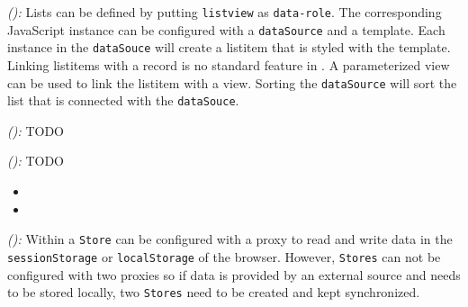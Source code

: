 \documentclass[a4paper]{artikel3}
\newcommand{\code}[1]{\texttt{#1}}
\newcommand{\setspace}[0]{\vspace{2mm}}
\renewcommand{\paragraph}[1]{\setspace \noindent {\bf #1}  }
\newcommand{\framework}[2]{ \emph{#1 (\textbf{#2}): }} %
\newcommand{\challenge}[1]{\paragraph{#1}}
\begin{document}
\framework{\kendoa{}}{}
Lists can be defined by putting \code{listview} as \code{data-role}.
The corresponding JavaScript instance can be configured with a \code{dataSource} and a template.
Each instance in the \code{dataSouce} will create a listitem that is styled with the template.
Linking listitems with a record is no standard feature in \kendo{}.
A parameterized view can be used to link the listitem with a view.
Sorting the \code{dataSource} will sort the list that is connected with the \code{dataSouce}.

\framework{\jqma{}}{}
TODO

\framework{\lungoa{}}{}
TODO

% 
% 
% 
% 
% 
% 
% 


\challenge{\chal{offline}}

\begin{itemize}
 \item {}
 \item {}
\end{itemize}


\framework{\sta{}}{}
Within \st{} a \code{Store} can be configured with a proxy to read and write data in the \code{sessionStorage} or \code{localStorage} of the browser.
However,  \code{Stores} can not be configured with two proxies so if data is provided by an external source and needs to be stored locally,  two \code{Stores} need to be created and kept synchronized.
\end{document}
